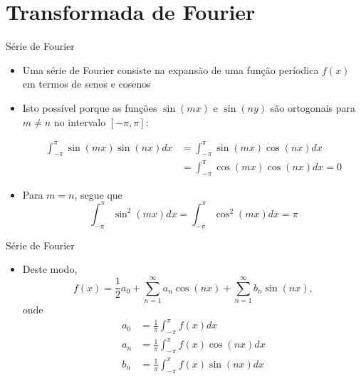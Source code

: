 \section{Transformada de Fourier}

\begin{frame}[fragile]{Série de Fourier}

    \begin{itemize}
        \item Uma série de Fourier consiste na expansão de uma função períodica $f(x)$ em termos
            de senos e cosenos

        \item Isto possível porque as funções $\sin(mx)$ e $\sin(ny)$ são ortogonais para 
            $m\neq n$ no intervalo $[-\pi, \pi]$:

        \begin{align*}
            \int_{-\pi}^\pi \sin(mx)\sin(nx) dx &= 
            \int_{-\pi}^\pi \sin(mx)\cos(nx) dx \\
            &= \int_{-\pi}^\pi \cos(mx)\cos(nx) dx = 0
        \end{align*}

        \item Para $m = n$, segue que
        \[
            \int_{-\pi}^\pi \sin^2(mx) dx = 
            \int_{-\pi}^\pi \cos^2(mx) dx = \pi
        \]

    \end{itemize}

\end{frame}

\begin{frame}[fragile]{Série de Fourier}

    \begin{itemize}
        \item Deste modo,
        \[
            f(x) = \frac{1}{2}a_0 + \sum_{n=1}^\infty a_n\cos(n x) + \sum_{n=1}^\infty b_n\sin(nx),
        \]
        onde
        \begin{align*}
            a_0 &= \frac{1}{\pi}\int_{-\pi}^{\pi} f(x)dx \\    
            a_n &= \frac{1}{\pi}\int_{-\pi}^{\pi} f(x)\cos(nx)dx \\    
            b_n &= \frac{1}{\pi}\int_{-\pi}^{\pi} f(x)\sin(nx)dx    
        \end{align*}
    
    \end{itemize}

\end{frame}

